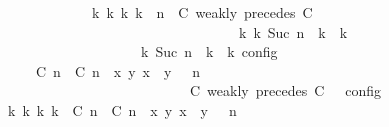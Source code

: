 \begin{isabellebody}
\ \ \ \ \ \ \ \ \ \ \ \ {\isasymLongrightarrow}\ {\isacharparenleft}{\isasymexists}{\isasymGamma}\isactrlsub k\ {\isasymPsi}\isactrlsub k\ {\isasymPhi}\isactrlsub k\ k{\isachardot}\ {\isacharparenleft}{\isacharparenleft}{\isasymGamma}{\isacharcomma}\ n\ {\isasymturnstile}\ {\isacharparenleft}{\isacharparenleft}C\ weakly\ precedes\ C\ {\isacharhash}\ {\isasymPsi}{\isacharparenright}\ {\isasymtriangleright}\ {\isasymPhi}{\isacharparenright}\isanewline
\ \ \ \ \ \ \ \ \ \ \ \ \ \ \ \ \ \ \ \ \ \ \ \ \ \ \ \ \ \ \ \ \ \ {\isasymhookrightarrow}\isactrlbsup k\isactrlesup \ {\isacharparenleft}{\isasymGamma}\isactrlsub k{\isacharcomma}\ Suc\ n\ {\isasymturnstile}\ {\isasymPsi}\isactrlsub k\ {\isasymtriangleright}\ {\isasymPhi}\isactrlsub k{\isacharparenright}{\isacharparenright}\isanewline
\ \ \ \ \ \ \ \ \ \ \ \ \ \ \ \ {\isasymand}\ {\isacharparenleft}{\isasymrho}\ {\isasymin}\ {\isasymlbrakk}\ {\isasymGamma}\isactrlsub k{\isacharcomma}\ Suc\ n\ {\isasymturnstile}\ {\isasymPsi}\isactrlsub k\ {\isasymtriangleright}\ {\isasymPhi}\isactrlsub k\ {\isasymrbrakk}\isactrlsub c\isactrlsub o\isactrlsub n\isactrlsub f\isactrlsub i\isactrlsub g{\isacharparenright}{\isacharparenright}{\isacartoucheclose}\isanewline
\ \ \ \ \ \ \isamarkupfalse%
\ {\isacharminus}\isanewline
\ \ \ \ \ \ \ \ \isamarkupfalse%
\ {\isacartoucheopen}{\isasymrho}\ {\isasymin}\ {\isasymlbrakk}\ {\isacharparenleft}{\isacharparenleft}{\isasymlceil}{\isacharhash}\isactrlsup {\isasymle}\ C\ n{\isacharcomma}\ {\isacharhash}\isactrlsup {\isasymle}\ C\ n{\isasymrceil}\ {\isasymin}\ {\isacharparenleft}{\isasymlambda}{\isacharparenleft}x{\isacharcomma}\ y{\isacharparenright}{\isachardot}\ x\ {\isasymle}\ y{\isacharparenright}{\isacharparenright}\ {\isacharhash}\ {\isasymGamma}{\isacharparenright}{\isacharcomma}\ n\isanewline
\ \ \ \ \ \ \ \ \ \ \ \ \ \ \ \ \ \ \ \ \ \ \ \ {\isasymturnstile}\ {\isasymPsi}\ {\isasymtriangleright}\ {\isacharparenleft}{\isacharparenleft}C\ weakly\ precedes\ C\ {\isacharhash}\ {\isasymPhi}{\isacharparenright}\ {\isasymrbrakk}\isactrlsub c\isactrlsub o\isactrlsub n\isactrlsub f\isactrlsub i\isactrlsub g{\isacartoucheclose}\isanewline
\ \ \ \ \ \ \ \ \isamarkupfalse%
\ {\isacartoucheopen}{\isasymexists}{\isasymGamma}\isactrlsub k\ {\isasymPsi}\isactrlsub k\ {\isasymPhi}\isactrlsub k\ k{\isachardot}\ {\isacharparenleft}{\isacharparenleft}{\isacharparenleft}{\isacharparenleft}{\isasymlceil}{\isacharhash}\isactrlsup {\isasymle}\ C\ n{\isacharcomma}\ {\isacharhash}\isactrlsup {\isasymle}\ C\ n{\isasymrceil}\ {\isasymin}\ {\isacharparenleft}{\isasymlambda}{\isacharparenleft}x{\isacharcomma}\ y{\isacharparenright}{\isachardot}\ x\ {\isasymle}\ y{\isacharparenright}{\isacharparenright}\ {\isacharhash}\ {\isasymGamma}{\isacharparenright}{\isacharcomma}\ n\isanewline

\end{isabellebody}
